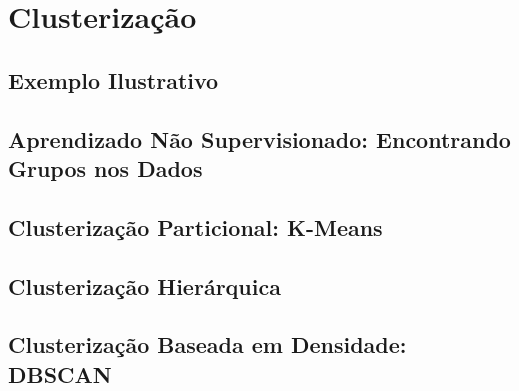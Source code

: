 
\chapter{Clusterização}
\label{cap:clusterizacao}

\section{Exemplo Ilustrativo}

\section{Aprendizado Não Supervisionado: Encontrando Grupos nos Dados}

\section{Clusterização Particional: K-Means}

\section{Clusterização Hierárquica}

\section{Clusterização Baseada em Densidade: DBSCAN}